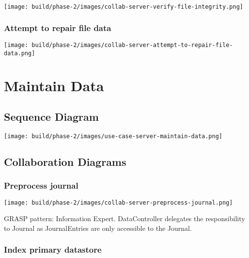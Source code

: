\documentclass[a4paper]{report}
\begin{document}
			\begin{center}
				\texttt{[image: build/phase-2/images/collab-server-verify-file-integrity.png]}
			\end{center}

		\subsubsection{Attempt to repair file data}

			\begin{center}
				\texttt{[image: build/phase-2/images/collab-server-attempt-to-repair-file-data.png]}
			\end{center}

	\pagebreak

\section{Maintain Data}

	\subsection{Sequence Diagram}

		\begin{center}
			\texttt{[image: build/phase-2/images/use-case-server-maintain-data.png]}
		\end{center}

	\subsection{Collaboration Diagrams}

		\subsubsection{Preprocess journal}

			\begin{center}
				\texttt{[image: build/phase-2/images/collab-server-preprocess-journal.png]}
			\end{center}

			GRASP pattern: Information Expert. DataController delegates the responsibility to Journal as JournalEntries are only accessible to the Journal.

		\subsubsection{Index primary datastore}
\end{document}
